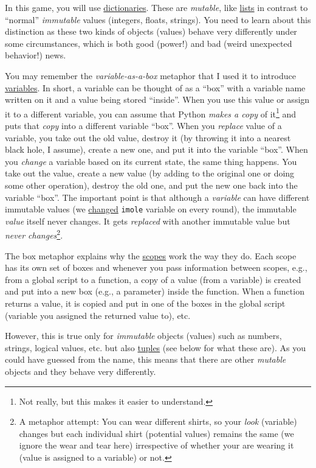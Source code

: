 \documentclass[
]{book}
\begin{document}
In this game, you will use \protect\hyperlink{dictionaries}{dictionaries}. These are \emph{mutable}, like \protect\hyperlink{lists}{lists} in contrast to ``normal'' \emph{immutable} values (integers, floats, strings). You need to learn about this distinction as these two kinds of objects (values) behave very differently under some circumstances, which is both good (power!) and bad (weird unexpected behavior!) news.

You may remember the \emph{variable-as-a-box} metaphor that I used it to introduce \protect\hyperlink{variables}{variables}. In short, a variable can be thought of as a ``box'' with a variable name written on it and a value being stored ``inside''. When you use this value or assign it to a different variable, you can assume that Python \emph{makes a copy} of it\footnote{Not really, but this makes it easier to understand.} and puts that \emph{copy} into a different variable ``box''. When you \emph{replace} value of a variable, you take out the old value, destroy it (by throwing it into a nearest black hole, I assume), create a new one, and put it into the variable ``box''. When you \emph{change} a variable based on its current state, the same thing happens. You take out the value, create a new value (by adding to the original one or doing some other operation), destroy the old one, and put the new one back into the variable ``box''. The important point is that although a \emph{variable} can have different immutable values (we \protect\hyperlink{random-mole}{changed} \texttt{imole} variable on every round), the immutable \emph{value} itself never changes. It gets \emph{replaced} with another immutable value but \emph{never changes}\footnote{A metaphor attempt: You can wear different shirts, so your \emph{look} (variable) changes but each individual shirt (potential values) remains the same (we ignore the wear and tear here) irrespective of whether your are wearing it (value is assigned to a variable) or not.}.

The box metaphor explains why the \protect\hyperlink{scopes-for-immutable-values}{scopes} work the way they do. Each scope has its own set of boxes and whenever you pass information between scopes, e.g., from a global script to a function, a copy of a value (from a variable) is created and put into a new box (e.g., a parameter) inside the function. When a function returns a value, it is copied and put in one of the boxes in the global script (variable you assigned the returned value to), etc.

However, this is true only for \emph{immutable} objects (values) such as numbers, strings, logical values, etc. but also \href{https://docs.python.org/3/library/stdtypes.html?highlight=tuple\#tuple}{tuples} (see below for what these are). As you could have guessed from the name, this means that there are other \emph{mutable} objects and they behave very differently.
\end{document}
